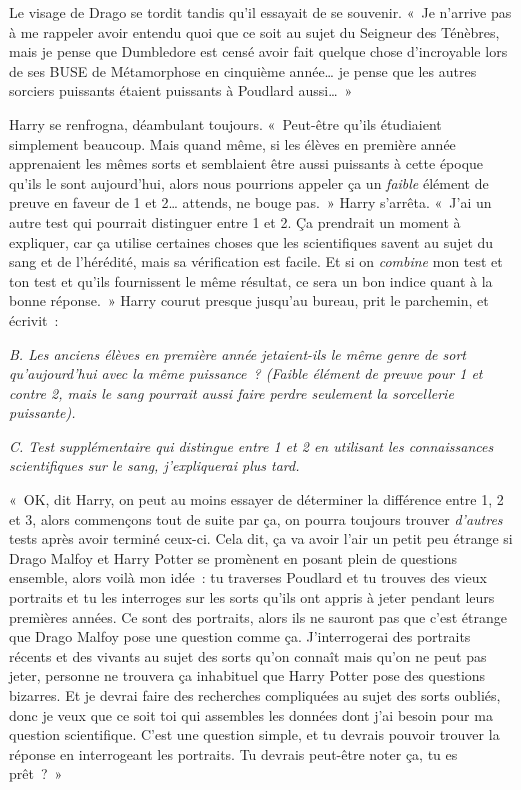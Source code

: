 Le visage de Drago se tordit tandis qu'il essayait de se souvenir. «~Je n'arrive pas à me rappeler avoir entendu quoi que ce soit au sujet du Seigneur des Ténèbres, mais je pense que Dumbledore est censé avoir fait quelque chose d'incroyable lors de ses BUSE de Métamorphose en cinquième année… je pense que les autres sorciers puissants étaient puissants à Poudlard aussi…~»

Harry se renfrogna, déambulant toujours. «~Peut-être qu'ils étudiaient simplement beaucoup. Mais quand même, si les élèves en première année apprenaient les mêmes sorts et semblaient être aussi puissants à cette époque qu'ils le sont aujourd'hui, alors nous pourrions appeler ça un \emph{faible} élément de preuve en faveur de 1 et 2… attends, ne bouge pas.~» Harry s'arrêta. «~J'ai un autre test qui pourrait distinguer entre 1 et 2. Ça prendrait un moment à expliquer, car ça utilise certaines choses que les scientifiques savent au sujet du sang et de l'hérédité, mais sa vérification est facile. Et si on \emph{combine} mon test et ton test et qu'ils fournissent le même résultat, ce sera un bon indice quant à la bonne réponse.~» Harry courut presque jusqu'au bureau, prit le parchemin, et écrivit~:

\emph{B. Les anciens élèves en première année jetaient-ils le même genre de sort qu'aujourd'hui avec la même puissance~? (Faible élément de preuve pour 1 et contre 2, mais le sang pourrait aussi faire perdre seulement la sorcellerie puissante).}

\emph{C. Test supplémentaire qui distingue entre 1 et 2 en utilisant les connaissances scientifiques sur le sang, j'expliquerai plus tard.}

«~OK, dit Harry, on peut au moins essayer de déterminer la différence entre 1, 2 et 3, alors commençons tout de suite par ça, on pourra toujours trouver \emph{d'autres} tests après avoir terminé ceux-ci. Cela dit, ça va avoir l'air un petit peu étrange si Drago Malfoy et Harry Potter se promènent en posant plein de questions ensemble, alors voilà mon idée~: tu traverses Poudlard et tu trouves des vieux portraits et tu les interroges sur les sorts qu'ils ont appris à jeter pendant leurs premières années. Ce sont des portraits, alors ils ne sauront pas que c'est étrange que Drago Malfoy pose une question comme ça. J'interrogerai des portraits récents et des vivants au sujet des sorts qu'on connaît mais qu'on ne peut pas jeter, personne ne trouvera ça inhabituel que Harry Potter pose des questions bizarres. Et je devrai faire des recherches compliquées au sujet des sorts oubliés, donc je veux que ce soit toi qui assembles les données dont j'ai besoin pour ma question scientifique. C'est une question simple, et tu devrais pouvoir trouver la réponse en interrogeant les portraits. Tu devrais peut-être noter ça, tu es prêt~?~»

